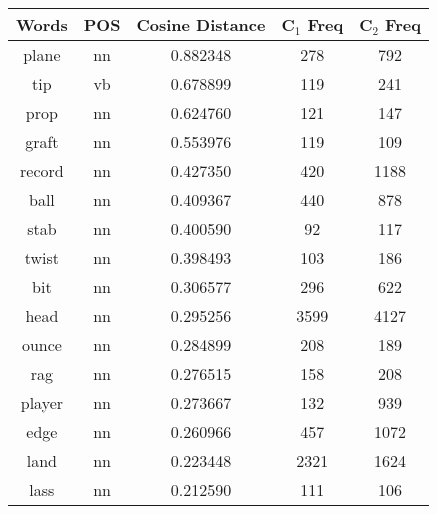 \begin{table}
\centering
\begin{tabular}{ccccc} 
\toprule
\textbf{ Words } & \textbf{POS } & \textbf{ Cosine Distance} & \textbf{ C$_1$ Freq } & \textbf{ C$_2$ Freq  }  \\ 
\midrule
plane            & nn            & 0.882348                 & 278                & 792                 \\
tip              & vb            & 0.678899                 & 119                & 241                 \\
prop             & nn            & 0.624760                 & 121                & 147                 \\
graft            & nn            & 0.553976                 & 119                & 109                 \\
record           & nn            & 0.427350                 & 420                & 1188                \\
ball             & nn            & 0.409367                 & 440                & 878                 \\
stab             & nn            & 0.400590                 & 92                 & 117                 \\
twist            & nn            & 0.398493                 & 103                & 186                 \\
bit              & nn            & 0.306577                 & 296                & 622                 \\
head             & nn            & 0.295256                 & 3599               & 4127                \\
ounce            & nn            & 0.284899                 & 208                & 189                 \\
rag              & nn            & 0.276515                 & 158                & 208                 \\
player           & nn            & 0.273667                 & 132                & 939                 \\
edge             & nn            & 0.260966                 & 457                & 1072                \\
land             & nn            & 0.223448                 & 2321               & 1624                \\
lass             & nn            & 0.212590                 & 111                & 106                 \\

\end{tabular}
\end{table}
